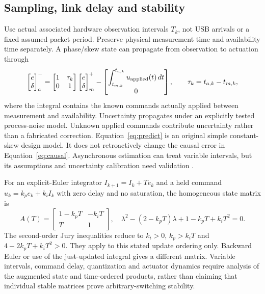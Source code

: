 \documentclass[11pt,letterpaper]{article}
\begin{document}
\subsection{Sampling, link delay and stability}
Use actual associated hardware observation intervals $T_k$, not USB arrivals or a fixed assumed packet period. Preserve physical measurement time and availability time separately. A phase/skew state can propagate from observation to actuation through
\begin{equation}
 \begin{bmatrix}e\\ \delta\end{bmatrix}_{a}^{-}
 =\begin{bmatrix}1&\tau_k\\0&1\end{bmatrix}
 \begin{bmatrix}e\\ \delta\end{bmatrix}_{m}^{+} -\begin{bmatrix}\displaystyle\int_{t_{m,k}}^{t_{a,k}}u_{\rm applied}(t)\,dt\\0\end{bmatrix},\qquad
 \tau_k=t_{a,k}-t_{m,k},\label{eq:predict}
\end{equation}
where the integral contains the known commands actually applied between measurement and availability. Uncertainty propagates under an explicitly tested process-noise model. Unknown applied commands contribute uncertainty rather than a fabricated correction. Equation~\ref{eq:predict} is an original simple constant-skew design model. It does not retroactively change the causal error in Equation~\ref{eq:causal}. Asynchronous estimation can treat variable intervals, but its assumptions and uncertainty calibration need validation \cite{freris}.

For an explicit-Euler integrator $I_{k+1}=I_k+T e_k$ and a held command $u_k=k_pe_k+k_iI_k$ with zero delay and no saturation, the homogeneous state matrix is
\begin{equation}
 A(T)=\begin{bmatrix}1-k_pT&-k_iT\\T&1\end{bmatrix},\quad
 \lambda^2-(2-k_pT)\lambda+1-k_pT+k_iT^2=0 .\label{eq:discrete}
\end{equation}
The second-order Jury inequalities reduce to $k_i>0$, $k_p>k_iT$ and $4-2k_pT+k_iT^2>0$. They apply to this stated update ordering only. Backward Euler or use of the just-updated integral gives a different matrix. Variable intervals, command delay, quantization and actuator dynamics require analysis of the augmented state and time-ordered products, rather than claiming that individual stable matrices prove arbitrary-switching stability.
\end{document}
